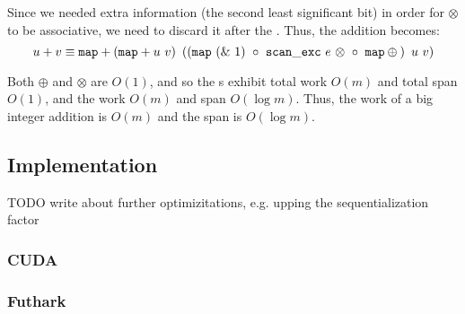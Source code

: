 Since we needed extra information (the second least significant bit) in order for $\otimes$ to be associative, we need to discard it after the . Thus, the addition becomes:
\begin{equation}
\label{eq:addgpu1}
u + v \equiv \mathtt{map} + \left( \mathtt{map} + u~v\right)~\left(\left(\mathtt{map}~(\&~1) ~\circ ~{\mathtt{scan\_exc}~e~\otimes}~ \circ ~ \mathtt{map} \oplus \phantom{}\right)~u~v\right)
\end{equation}

Both $\oplus$ and $\otimes$ are $O(1)$, and so the s exhibit total work $O(m)$ and total span $O(1)$, and the  work $O(m)$ and span $O(\log m)$. Thus, the work of a big integer addition is $O(m)$ and the span is $O(\log m)$.

\subsection{Implementation}

{\color{red} TODO write about further optimizitations, e.g. upping the sequentialization factor}

\subsubsection{CUDA}

\subsubsection{Futhark}


